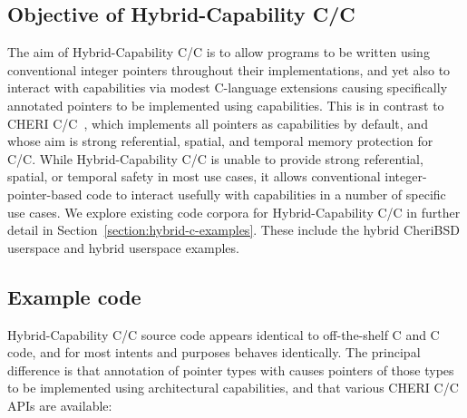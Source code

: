 \documentclass[12pt,twoside,openright,a4paper]{article}
\newcommand{\ccode}[1]{{\small\ttfamily{#1}}}
\newcommand{\uucap}{{\ccode{\_\_capability}}\xspace}
\newcommand{\note}[2]{{\color{blue}[ Note: #1 - #2]}}
\renewcommand{\note}[2]{\relax\ifhmode\unskip\fi}
\newcommand{\psnote}[1]{\note{#1}{Peter S.}}
\newcommand*{\cpp}{\texorpdfstring{C\textsmaller[2]{\protect\nolinebreak[4]\hspace{-.05em}\raisebox{.45ex}{\textbf{++}}}}{C++}}
\newcommand*{\COrCpp}{C/\cpp{}}
\newcommand*{\purecapCOrCpp}{CHERI \COrCpp{}}
\newcommand*{\hybridCOrCpp}{Hybrid-Capability \COrCpp{}}
\begin{document}
\subsection{Objective of \hybridCOrCpp{}}

The aim of \hybridCOrCpp{} is to allow programs to be written using
conventional integer pointers throughout their implementations, and yet also
to interact with capabilities via modest C-language extensions causing
specifically annotated pointers to be implemented using capabilities.
This is in contrast to \purecapCOrCpp{}~\cite{UCAM-CL-TR-947}, which
implements all pointers as capabilities by default, and whose aim is strong
referential, spatial, and temporal memory protection for C/\cpp{}.
\psnote{including ``temporal'' there, unqualified, is going to be confusing.  Suggest splitting the sentence up and describing more explicitly what the current state and plausible options are w.r.t. temporal}
While \hybridCOrCpp{} is unable to provide strong referential, spatial, or
temporal safety in most use cases, it allows conventional
integer-pointer-based code to interact usefully with capabilities in a number
of specific use cases.
\psnote{that seems to underplay what one can get from hybrid -- surely one can say something about ``specific protections'' or ``protection in specific ways'' or something?}
We explore existing code corpora for \hybridCOrCpp{} in further detail in
Section~\ref{section:hybrid-c-examples}.
These include the hybrid CheriBSD userspace and hybrid userspace examples.

\subsection{Example code}

\hybridCOrCpp{} source code appears identical to off-the-shelf C and \cpp{}
code, and for most intents and purposes behaves identically.
The principal difference is that annotation of pointer types with \uucap{}
causes pointers of those types to be implemented using architectural
capabilities, and that various \purecapCOrCpp{} APIs are available:
\end{document}

